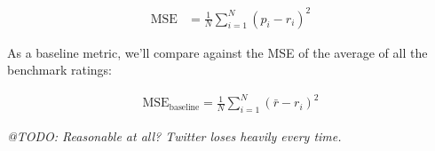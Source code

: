 \begin{align}
  \text{MSE} &= \frac{1}{N} \sum_{i=1}^N (p_i - r_i)^2
\end{align}

As a baseline metric, we'll compare against the MSE of the average of all the benchmark ratings:

\begin{align}
  \text{MSE}_\text{baseline} = \frac{1}{N} \sum_{i=1}^N (\bar{r} - r_i)^2
\end{align}

\emph{@TODO: Reasonable at all? Twitter loses heavily every time.}

